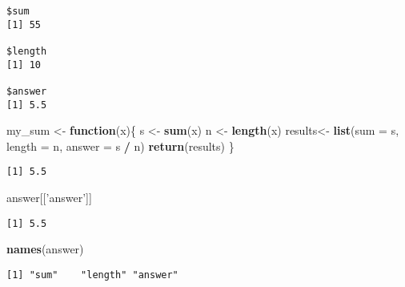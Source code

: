\documentclass[12pt,letterpaperpaper,openany]{book}
\newenvironment{Shaded}{\begin{snugshade}}{\end{snugshade}}
\newcommand{\ControlFlowTok}[1]{\textcolor[rgb]{0.13,0.29,0.53}{\textbf{#1}}}
\newcommand{\DataTypeTok}[1]{\textcolor[rgb]{0.13,0.29,0.53}{#1}}
\newcommand{\DecValTok}[1]{\textcolor[rgb]{0.00,0.00,0.81}{#1}}
\newcommand{\KeywordTok}[1]{\textcolor[rgb]{0.13,0.29,0.53}{\textbf{#1}}}
\newcommand{\NormalTok}[1]{#1}
\newcommand{\OperatorTok}[1]{\textcolor[rgb]{0.81,0.36,0.00}{\textbf{#1}}}
\newcommand{\StringTok}[1]{\textcolor[rgb]{0.31,0.60,0.02}{#1}}
\begin{document}
\begin{verbatim}
$sum
[1] 55

$length
[1] 10

$answer
[1] 5.5
\end{verbatim}

\begin{Shaded}
\begin{Highlighting}[]
\NormalTok{my_sum <-}\StringTok{ }\ControlFlowTok{function}\NormalTok{(x)\{}
\NormalTok{  s <-}\StringTok{ }\KeywordTok{sum}\NormalTok{(x)}
\NormalTok{  n <-}\StringTok{ }\KeywordTok{length}\NormalTok{(x)}
\NormalTok{  results<-}\StringTok{ }\KeywordTok{list}\NormalTok{(}\DataTypeTok{sum =}\NormalTok{ s, }\DataTypeTok{length =}\NormalTok{ n, }\DataTypeTok{answer =}\NormalTok{ s }\OperatorTok{/}\StringTok{ }\NormalTok{n)}
  \KeywordTok{return}\NormalTok{(results)}
\NormalTok{\}}
\end{Highlighting}
\end{Shaded}

\begin{Shaded}
\end{Shaded}

\begin{verbatim}
[1] 5.5
\end{verbatim}

\begin{Shaded}
\begin{Highlighting}[]
\NormalTok{answer[[}\StringTok{'answer'}\NormalTok{]]}
\end{Highlighting}
\end{Shaded}

\begin{verbatim}
[1] 5.5
\end{verbatim}

\begin{Shaded}
\begin{Highlighting}[]
\KeywordTok{names}\NormalTok{(answer)}
\end{Highlighting}
\end{Shaded}

\begin{verbatim}
[1] "sum"    "length" "answer"
\end{verbatim}
\end{document}
